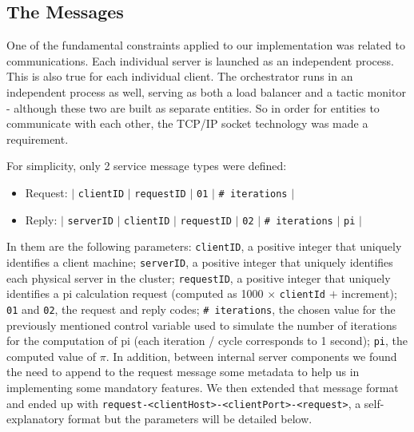 \documentclass[12pt]{article}
\begin{document}
\subsection{The Messages} \label{messages} %

One of the fundamental constraints applied to our implementation was related to communications.
Each individual server is launched as an independent process.
This is also true for each individual client.
The orchestrator runs in an independent process as well, serving as both a load balancer and a tactic monitor - although these two are built as separate entities.
So in order for entities to communicate with each other, the TCP/IP socket technology was made a requirement.

For simplicity, only 2 service message types were defined:
\vspace{-10pt}
\begin{itemize}[noitemsep]
  \item Request: $|$ \texttt{clientID} $|$ \texttt{requestID} $|$ \texttt{01} $|$ \texttt{\# iterations} $|$
  \item Reply: $|$ \texttt{serverID} $|$ \texttt{clientID} $|$ \texttt{requestID} $|$ \texttt{02} $|$ \texttt{\# iterations} $|$ \texttt{pi} $|$
\end{itemize}
\vspace{-10pt}
In them are the following parameters:
\texttt{clientID}, a positive integer that uniquely identifies a client machine;
\texttt{serverID}, a positive integer that uniquely identifies each physical server in the cluster;
\texttt{requestID}, a positive integer that uniquely identifies a pi calculation request (computed as 1000 $\times$ \texttt{clientId} $+$ increment);
\texttt{01} and \texttt{02}, the request and reply codes;
\texttt{\# iterations}, the chosen value for the previously mentioned control variable used to simulate the number of iterations for the computation of pi
(each iteration / cycle corresponds to 1 second);
\texttt{pi}, the computed value of $\pi$. In addition, between internal server components we found the need to append to the request message some metadata to help us in implementing some mandatory features. We then extended that message format and ended up with \texttt{request-<clientHost>-<clientPort>-<request>}, a self-explanatory format but the parameters will be detailed below.
\end{document}
